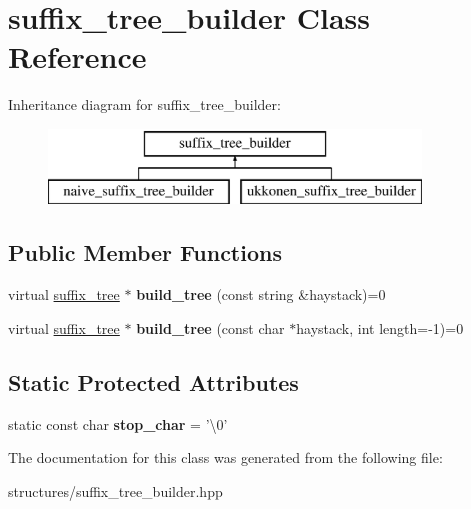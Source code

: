 \hypertarget{classsuffix__tree__builder}{\section{suffix\+\_\+tree\+\_\+builder Class Reference}
\label{classsuffix__tree__builder}
}
Inheritance diagram for suffix\+\_\+tree\+\_\+builder\+:\begin{figure}[H]
\begin{center}
\leavevmode
\includegraphics[height=2.000000cm]{classsuffix__tree__builder}
\end{center}
\end{figure}
\subsection*{Public Member Functions}
\begin{DoxyCompactItemize}
\item 
\hypertarget{classsuffix__tree__builder_aff50e4acf552359f8c72130b9c589825}{virtual \hyperlink{classsuffix__tree}{suffix\+\_\+tree} $\ast$ {\bfseries build\+\_\+tree} (const string \&haystack)=0}\label{classsuffix__tree__builder_aff50e4acf552359f8c72130b9c589825}

\item 
\hypertarget{classsuffix__tree__builder_a1dd1414a13def280ee9f1b90a46d6371}{virtual \hyperlink{classsuffix__tree}{suffix\+\_\+tree} $\ast$ {\bfseries build\+\_\+tree} (const char $\ast$haystack, int length=-\/1)=0}\label{classsuffix__tree__builder_a1dd1414a13def280ee9f1b90a46d6371}

\end{DoxyCompactItemize}
\subsection*{Static Protected Attributes}
\begin{DoxyCompactItemize}
\item 
\hypertarget{classsuffix__tree__builder_a50d71959120fb1a65cae59b7288d7dd4}{static const char {\bfseries stop\+\_\+char} = '\textbackslash{}0'}\label{classsuffix__tree__builder_a50d71959120fb1a65cae59b7288d7dd4}

\end{DoxyCompactItemize}


The documentation for this class was generated from the following file\+:\begin{DoxyCompactItemize}
\item 
structures/suffix\+\_\+tree\+\_\+builder.\+hpp\end{DoxyCompactItemize}
